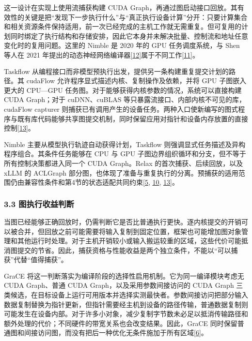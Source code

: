 \documentclass[UTF8,11pt,fontset=windows]{ctexart}
\begin{document}
这一设计在实现上使用流捕获构建 CUDA Graph，再通过图启动接口回放。其有效性的关键是把``发现下一步执行什么''与``真正执行设备计算''分开：只要计算集合和相关资源条件保持适用，前一次已经完成的主机工作就无需重复。但可复用的计划同时绑定了执行结构和存储安排，因此它本身并未解决批量、控制流和地址任意变化时的复用问题。这里的 Nimble 是 2020 年的 GPU 任务调度系统，与 Shen 等人在 2021 年提出的动态神经网络编译器\protect\hyperlink{ref-12}{{[}12{]}}属于不同工作\protect\hyperlink{ref-11}{{[}11{]}}。

Taskflow 从编程接口而非模型预执行出发，提供另一条构建重复提交计划的路径。其 cudaFlow 允许程序显式描述内核、复制操作及依赖，并将 GPU 子图嵌入更大的 CPU---GPU 任务图。对于能够获得内核参数的情况，系统可以直接构建 CUDA Graph；对于 cuDNN、cuBLAS 等只暴露流接口、内部内核不可见的库，cudaFlow capturer 则捕获已有调用产生的设备任务。两种入口使新编写的图式程序与既有库代码能够共享图提交机制，同时保留应用对指针和设备内存放置的直接控制\protect\hyperlink{ref-13}{{[}13{]}}。

Nimble 主要从模型执行轨迹自动获得计划，Taskflow 则强调显式任务描述及异构程序组合。其条件任务能够在 CPU 与 GPU 子图边界组织循环和分支，但不等于所有控制决策都进入同一个 CUDA Graph。Relax 的首次捕获、后续回放，以及 xLLM 的 ACLGraph 部分图，也体现了准备与重复执行的分离。预捕获的适用范围仍由兼容性条件和第4节的状态适配共同约束\protect\hyperlink{ref-5}{{[}5}, \protect\hyperlink{ref-10}{10}, \protect\hyperlink{ref-13}{13{]}}。

\hypertarget{section-3-3}{%
\subsubsection{\texorpdfstring{\textbf{3.3 图执行收益判断}}{3.3 图执行收益判断}}\label{section-3-3}}

当图已经能够正确回放时，仍需判断它是否比普通执行更快。逐内核提交的开销可以被合并，但回放之前可能需要将输入复制到固定位置，框架也可能增加图对象管理和其他运行时处理。对于主机开销较小或输入搬运较重的区域，这些代价可能抵消图提交的节省。因此，捕获资格与性能收益是两个独立条件，不能以``可以捕获''代替``值得捕获''。

GraCE 将这一判断落实为编译阶段的选择性启用机制。它为同一编译模块考虑无 CUDA Graph、普通 CUDA Graph，以及采用参数间接访问的 CUDA Graph 三类候选，在目标设备上运行可用版本并选择实测最快者。参数间接访问把部分输入数据复制替换为指针更新，但指针需要经主机到设备的路径传输，普通数据复制则可能发生在设备内部。对于许多小对象，减少复制字节数未必足以抵消传输路径和额外处理的代价；不同硬件的带宽关系也会改变结果。因此，GraCE 同时保留普通图和间接访问图，而没有把后一种优化无条件施加于所有区域\protect\hyperlink{ref-6}{{[}6{]}}。
\end{document}
